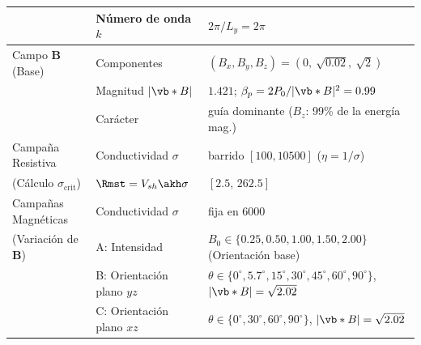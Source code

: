 \begin{table}[H]
\begin{tabular}{lll}
              & Número de onda $k$       & $2\pi/L_y=2\pi$\\
\midrule
Campo $\mathbf{B}$ (Base) & Componentes   & $(B_x,B_y,B_z)=(0,\ \sqrt{0.02},\ \sqrt{2})$\\
             & Magnitud $|\vb*{B}|$      & $1.421$; $\beta_p=2P_0/|\vb*{B}|^2=0.99$\\
             & Carácter                  & guía dominante ($B_z$: 99\% de la energía mag.)\\
\midrule
Campaña Resistiva & Conductividad $\sigma$    & barrido $[100,10500]$ ($\eta=1/\sigma$)\\
(Cálculo $\sigma_{\mathrm{crit}}$) & $\Rmst=V_{sh}\akh\sigma$  & $[2.5,\,262.5]$\\
\midrule
Campañas Magnéticas & Conductividad $\sigma$ & fija en $6000$\\
(Variación de $\mathbf{B}$) & A: Intensidad  & $B_0 \in \{0.25, 0.50, 1.00, 1.50, 2.00\}$ (Orientación base)\\
             & B: Orientación plano $yz$ & $\theta \in \{0^\circ, 5.7^\circ, 15^\circ, 30^\circ, 45^\circ, 60^\circ, 90^\circ\}$, $|\vb*{B}|=\sqrt{2.02}$\\
             & C: Orientación plano $xz$ & $\theta \in \{0^\circ, 30^\circ, 60^\circ, 90^\circ\}$, $|\vb*{B}|=\sqrt{2.02}$\\
\bottomrule
\end{tabular}
\end{table}